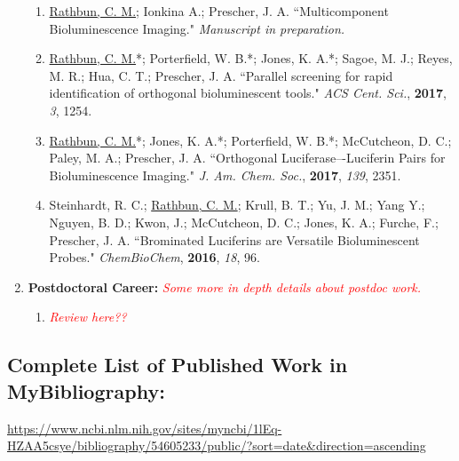 \documentclass{nihbiosketch}
\newcommand{\comment}[1]{\textit{\textcolor{red}{#1}}}
\begin{document}
\begin{enumerate}
\begin{enumerate}

  \item \underline{Rathbun, C. M.}; Ionkina A.; Prescher, J. A. ``Multicomponent Bioluminescence Imaging."  \textit{Manuscript in preparation.}

  \item \underline{Rathbun, C. M.}*; Porterfield, W. B.*; Jones, K. A.*; Sagoe, M. J.; Reyes, M. R.; Hua, C. T.; Prescher, J. A. ``Parallel screening for rapid identification of orthogonal bioluminescent tools." \textit{ACS Cent. Sci.}, \textbf{2017}, \textit{3}, 1254.


  \item \underline{Rathbun, C. M.}*; Jones, K. A.*; Porterfield, W. B.*; McCutcheon, D. C.; Paley, M. A.; Prescher, J. A. ``Orthogonal Luciferase–-Luciferin Pairs for Bioluminescence Imaging." \textit{J. Am. Chem. Soc.}, \textbf{2017}, \textit{139}, 2351.

  \item Steinhardt, R. C.; \underline{Rathbun, C. M.}; Krull, B. T.; Yu, J. M.; Yang Y.; Nguyen, B. D.; Kwon, J.; McCutcheon, D. C.; Jones, K. A.; Furche, F.; Prescher, J. A. ``Brominated Luciferins are Versatile Bioluminescent Probes." \textit{ChemBioChem}, \textbf{2016}, \textit{18}, 96.

\end{enumerate}

\item \textbf{Postdoctoral Career:} \comment{Some more in depth details about postdoc work.}

\begin{enumerate}

	\item \comment{Review here??}

\end{enumerate}

\end{enumerate}

\subsection*{Complete List of Published Work in MyBibliography:}
\url{https://www.ncbi.nlm.nih.gov/sites/myncbi/1lEq-HZAA5csye/bibliography/54605233/public/?sort=date&direction=ascending}
\end{document}
